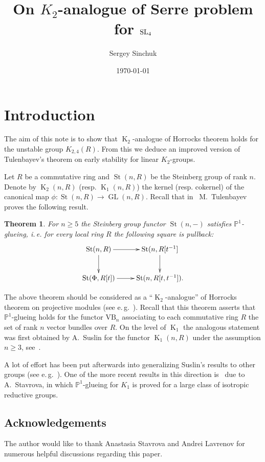 \documentclass[oneside, 10pt]{amsart}
\title{On $K_2$-analogue of Serre problem for $\operatorname{SL}_4$}
\author {Sergey Sinchuk}
\date {\today}
\DeclareMathOperator{\St}{St}
\DeclareMathOperator{\GL}{GL}
\DeclareMathOperator{\K}{K}
\numberwithin{equation}{section}
\numberwithin{lemma}{section}
\newtheorem*{thm*}{Theorem}
\theoremstyle{definition}
\theoremstyle{remark}
\begin{document}
   
\maketitle

\section{Introduction}

The aim of this note is to show that $\K_2$-analogue of Horrocks theorem holds for the unstable group $K_{2, 4}(R)$.
From this we deduce an improved version of Tulenbayev's theorem on early stability for linear $K_2$-groups.

Let $R$ be a commutative ring and $\St(n, R)$ be the Steinberg group of rank $n$.
Denote by $\K_2(n, R)$ (resp. $\K_1(n, R)$) the kernel (resp. cokernel) of the canonical map $\phi\colon \St(n, R) \to \GL(n, R)$.
Recall that in~\cite[Theorem~5.1]{Tu83} M.~Tulenbayev proves the following result.
\begin{thm*} For $n \geq 5$ the Steinberg group functor $\St(n, -)$ satisfies $\mathbb{P}^1$-glueing, i.\,e. for every
 local ring $R$ the following square is pullback:
 \[\xymatrix{ \St(n, R)    \ar[r]\ar[d] & \ar[d] \St(n, R[t^{-1}] \\ 
              \St(\Phi, R[t]) \ar[r]       &        \St(n, R[t, t^{-1}]).}\]
\end{thm*}
The above theorem should be considered as a ``$\K_2$-analogue'' of Horrocks theorem on projective modules (see e.\,g.~\cite[Ch.~IV]{Lam10}).
Recall that this theorem asserts that $\mathbb{P}^1$-glueing holds for the functor $\mathrm{VB}_n$ 
 associating to each commutative ring $R$ the set of rank $n$ vector bundles over $R$.
On the level of $\K_1$ the analogous statement was first obtained by A.~Suslin for the functor $\K_1(n, R)$ under the assumption $n\geq 3$, see~\cite{Su77}.

A lot of effort has been put afterwards into generalizing Suslin's results to other groups (see e.\,g.~\cite{Abe83}). 
One of the more recent results in this direction is~\cite[Theorem~1.1]{St-poly} due to A.~Stavrova, in which
 $\mathbb{P}^1$-glueing for $K_1$ is proved for a large class of isotropic reductive groups.
 
\subsection{Acknowledgements}
The author would like to thank Anastasia Stavrova and Andrei Lavrenov for numerous helpful discussions regarding this paper.
\end{document}
